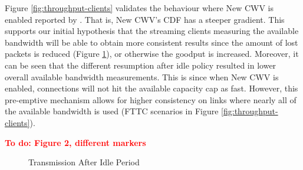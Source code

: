 \documentclass[10pt,sigconf,anonymous]{acmart}
\newcommand{\todo}[1]{\textbf{\textcolor{red}{To do: #1}}}
\begin{document}
Figure \ref{fig:throughput-clients} validates the behaviour where New CWV is enabled reported by \cite{Nazir-2014-performance-evaluation-congestion-window-validation-dash-newcwv}. That is, New CWV's CDF has a steeper gradient. This supports our initial hypothesis that the streaming clients measuring the available bandwidth will be able to obtain more consistent results since the amount of lost packets is reduced (Figure \ref{fig:transmission-after-idle}), or otherwise the goodput is increased. Moreover, it can be seen that the different resumption after idle policy resulted in lower overall available bandwidth measurements. This is since when New CWV is enabled, connections will not hit the available capacity cap as fast. However, this pre-emptive mechanism allows for higher consistency on links where nearly all of the available bandwidth is used (FTTC scenarios in Figure \ref{fig:throughput-clients}).


\todo{Figure 2, different markers}
\begin{figure}
  \centering
    \caption{Transmission After Idle Period}
    \label{fig:transmission-after-idle}
\end{figure}
\end{document}
